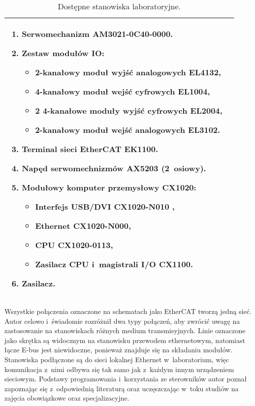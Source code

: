 \begin{table}[!htb]
\begin{center}
\begin{tabular}{| p{} | p{} |}
\begin{enumerate}[leftmargin=7mm]
\item Serwomechanizm AM3021-0C40-0000.
\item Zestaw modułów IO:
\begin{itemize}[leftmargin=3mm]
\setlength{\itemsep}{3pt}
\setlength{\parskip}{0pt}
\setlength{\parsep}{0pt}
\item 2-kanałowy moduł wyjść analogowych EL4132,
\item 4-kanałowy moduł wejść cyfrowych EL1004,
\item 2 4-kanałowe moduły wyjść cyfrowych EL2004,
\item 2-kanałowy moduł wejść analogowych EL3102.
\end{itemize}
\item Terminal sieci EtherCAT EK1100.
\item Napęd serwomechnizmów AX5203 (2~osiowy).
\item Modułowy komputer przemysłowy CX1020:
\begin{itemize}[leftmargin=3mm]
\setlength{\itemsep}{3pt}
\setlength{\parskip}{0pt}
\setlength{\parsep}{0pt}
\item Interfejs USB/DVI CX1020-N010 ,
\item Ethernet CX1020-N000,
\item CPU CX1020-0113,
\item Zasilacz CPU i~magistrali I/O CX1100.
\end{itemize}
\item Zasilacz.
\end{enumerate}
\\\hline                                            
\end{tabular}
\end{center}
\vspace*{-6mm}
  \caption{Dostępne stanowiska laboratoryjne.}
	\label{stanowiska}
\end{table}

\noindent Wszystkie połączenia oznaczone na schematach jako EtherCAT tworzą jedną sieć. Autor celowo i~świadomie rozróżnił dwa typy połączeń, aby zwrócić uwagę na zastosowanie na stanowiskach różnych medium transmisyjnych. Linie oznaczone jako skrętka są widocznym na stanowisku przewodem ethernetowym, natomiast łącze E-bus jest niewidoczne, ponieważ znajduje się na składaniu modułów.
\clearpage
\noindent Stanowiska podłączone są do sieci lokalnej Ethernet w~laboratorium, więc komunikacja z~nimi odbywa się tak samo jak z~każdym innym urządzeniem sieciowym. Podstawy programowania i~korzystania ze sterowników autor poznał zapoznając się z~odpowiednią literaturą \cite{plc1,plc2,plc4,plc5,plc6} oraz uczęszczając w~toku studiów na zajęcia obowiązkowe oraz specjalizacyjne.
